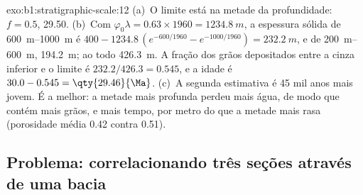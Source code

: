 \begin{solution}{exo:b1:stratigraphic-scale:12}
(a)~O limite está na metade da profundidade: $f = 0.5$, \qty{29.50}{\Ma}. (b)~Com
$\varphi_0\lambda = 0.63 \times 1960 = \qty{1234.8}{m}$, a espessura sólida de
\qtyrange{600}{1000}{m} é $400 - 1234.8\,(e^{-600/1960} - e^{-1000/1960}) =
\qty{232.2}{m}$, e de \qtyrange{200}{600}{m}, \qty{194.2}{m}; ao todo
\qty{426.3}{m}. A fração dos grãos depositados entre a cinza inferior e o limite é
$232.2/426.3 = 0.545$, e a idade é $30.0 - 0.545 =
\qty{29.46}{\Ma}$. (c)~A segunda estimativa é \num{45} mil anos mais jovem. É a melhor: a
metade mais profunda perdeu mais água, de modo que contém mais grãos, e mais tempo, por metro
do que a metade mais rasa (porosidade média \num{0.42} contra \num{0.51}).
\end{solution}

\subsection*{Problema: correlacionando três seções através de uma bacia}

